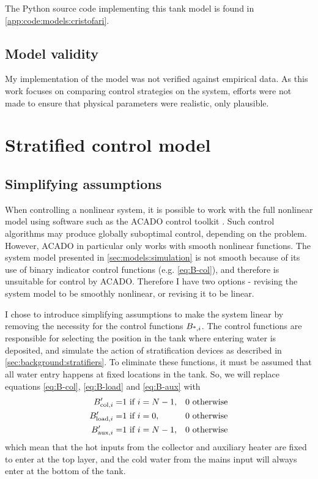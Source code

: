 The Python source code implementing this tank model is found in \autoref{app:code:models:cristofari}.

\subsection{Model validity}

My implementation of the model was not verified against empirical data.
As this work focuses on comparing control strategies on the system, efforts were not made to ensure that physical parameters were realistic, only plausible.

\section{Stratified control model}
\label{sec:models:control}

\subsection{Simplifying assumptions}

When controlling a nonlinear system, it is possible to work with the full nonlinear model using software such as the ACADO control toolkit \textcite{ACADO}.
Such control algorithms may produce globally suboptimal control, depending on the problem.
However, ACADO in particular only works with smooth nonlinear functions.
The system model presented in \autoref{sec:models:simulation} is not smooth because of its use of binary indicator control functions (e.g. \autoref{eq:B-col}), and therefore is unsuitable for control by ACADO.
Therefore I have two options - revising the system model to be smoothly nonlinear, or revising it to be linear.

I chose to introduce simplifying assumptions to make the system linear by removing the necessity for the control functions $B_{\text{*}, i}$.
The control functions are responsible for selecting the position in the tank where entering water is deposited, and simulate the action of stratification devices as described in \autoref{sec:background:stratifiers}.
To eliminate these functions, it must be assumed that all water entry happens at fixed locations in the tank.
So, we will replace equations \ref{eq:B-col}, \ref{eq:B-load} and \ref{eq:B-aux} with
\begin{eqnarray}
   \label{eq:B-col'}  B_{\text{col}, i}'  =& 1 \text{ if } i = N-1, & 0 \text{ otherwise} \\
   \label{eq:B-load'} B_{\text{load}, i}' =& 1 \text{ if } i = 0,   & 0 \text{ otherwise} \\
   \label{eq:B-aux'}  B_{\text{aux}, i}'  =& 1 \text{ if } i = N-1, & 0 \text{ otherwise}
\end{eqnarray}
which mean that the hot inputs from the collector and auxiliary heater are fixed to enter at the top layer, and the cold water from the mains input will always enter at the bottom of the tank.

